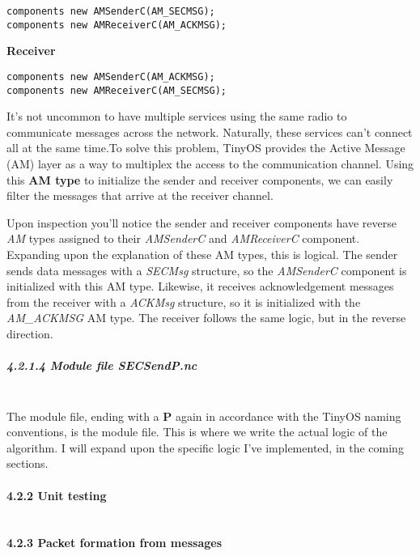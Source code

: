 \begin{verbatim}
components new AMSenderC(AM_SECMSG);
components new AMReceiverC(AM_ACKMSG);
\end{verbatim}

\textbf{Receiver}

\begin{verbatim}
components new AMSenderC(AM_ACKMSG);
components new AMReceiverC(AM_SECMSG);
\end{verbatim}

It's not uncommon to have multiple services using the same radio to
communicate messages across the network. Naturally, these services can't
connect all at the same time.To solve this problem, TinyOS provides the
Active Message (AM) layer as a way to multiplex the access to the
communication channel. Using this \textbf{AM type} to initialize the
sender and receiver components, we can easily filter the messages that
arrive at the receiver channel.

Upon inspection you'll notice the sender and receiver components have
reverse \emph{AM} types assigned to their \emph{AMSenderC} and
\emph{AMReceiverC} component. Expanding upon the explanation of these AM
types, this is logical. The sender sends data messages with a
\emph{SECMsg} structure, so the \emph{AMSenderC} component is
initialized with this AM type. Likewise, it receives acknowledgement
messages from the receiver with a \emph{ACKMsg} structure, so it is
initialized with the \emph{AM\_ACKMSG} AM type. The receiver follows the
same logic, but in the reverse direction.

\subparagraph{4.2.1.4 Module file
\emph{SECSendP.nc}\\\\}\label{module-file-secsendp.nc}

The module file, ending with a \textbf{P} again in accordance with the
TinyOS naming conventions, is the module file. This is where we write
the actual logic of the algorithm. I will expand upon the specific logic
I've implemented, in the coming sections.

\paragraph{4.2.2 Unit testing\\\\}\label{unit-testing}

\paragraph{4.2.3 Packet formation from
messages\\\\}\label{packet-formation-from-messages}

